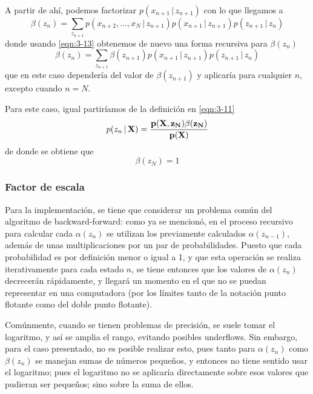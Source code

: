 A partir de ahí, podemos factorizar $p(x_{n+1} \,|\, z_{n+1})$ con lo que llegamos a 
\begin{equation}  
  \beta(z_n) = \sum_{z_{n+1}} p(x_{n+2}, ..., x_N \,|\, z_{n+1}) 
    p(x_{n+1} \,|\, z_{n+1}) p(z_{n+1} \,|\, z_n)    
    \label{eqn:3-17}
\end{equation}
donde usando \eqref{eqn:3-13} obtenemos de nuevo una forma recursiva para $\beta(z_n)$
\begin{equation}  
  \beta(z_n) = \sum_{z_{n+1}} \beta(z_{n+1})
    p(x_{n+1} \,|\, z_{n+1}) p(z_{n+1} \,|\, z_n)    
    \label{eqn:3-18}
\end{equation}
que en este caso dependería del valor de $\beta(z_{n+1})$ y aplicaría para cualquier $n$, excepto cuando $n = N$. 

Para este caso, igual partiríamos de la definición en \eqref{eqn:3-11}
\begin{equation}
  p(z_n \,|\, \bf{X}) = \frac{p(\bf{X}, z_N) \beta(z_N)} {p(\bf{X})}
  \label{eqn:3-19}
\end{equation}
de donde se obtiene que 
\begin{equation}
  \beta(z_N) = 1
  \label{eqn:3-20}
\end{equation}

\subsubsection{Factor de escala}
\label{sec:escala}

Para la implementación, se tiene que considerar un problema común del algoritmo de backward-forward: como ya se mencionó, en el proceso recursivo para calcular cada $\alpha(z_n)$ se utilizan los previamente calculados $\alpha(z_{n-1})$, además de unas multiplicaciones por un par de probabilidades. Puesto que cada probabilidad es por definición menor o igual a 1, y que esta operación se realiza iterativamente para cada estado $n$, se tiene entonces que los valores de $\alpha(z_n)$ decrecerán rápidamente, y llegará un momento en el que no se puedan representar en una computadora (por los límites tanto de la notación punto flotante como del doble punto flotante).

Comúnmente, cuando se tienen problemas de precisión, se suele tomar el logaritmo, y así se amplia el rango, evitando posibles underflows. Sin embargo, para el caso presentado, no es posible realizar esto, pues tanto para $\alpha(z_n)$ como $\beta(z_n)$ se manejan sumas de números pequeños, y entonces no tiene sentido usar el logaritmo; pues el logaritmo no se aplicaría directamente sobre esos valores que pudieran ser pequeños; sino sobre la suma de ellos.

